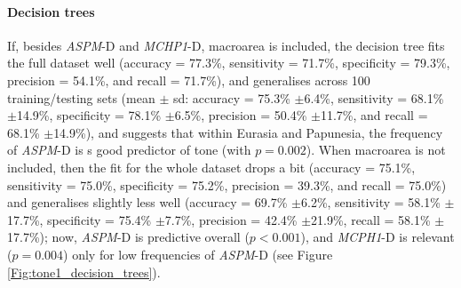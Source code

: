 \documentclass[twoside,twocolumn]{article}
\begin{document}
\paragraph{Decision trees}

If, besides \textit{ASPM}-D and \textit{MCHP1}-D, macroarea is included, the decision tree fits the full dataset well (accuracy = 77.3\%, sensitivity = 71.7\%, specificity = 79.3\%, precision = 54.1\%, and recall = 71.7\%), and generalises across 100 training/testing sets (mean $\pm$ sd: accuracy = 75.3\% $\pm$6.4\%, sensitivity = 68.1\% $\pm$14.9\%, specificity = 78.1\% $\pm$6.5\%, precision = 50.4\% $\pm$11.7\%, and recall = 68.1\% $\pm$14.9\%), and suggests that within Eurasia and Papunesia, the frequency of \textit{ASPM}-D is s good predictor of tone (with $p = 0.002$).
When macroarea is not included, then the fit for the whole dataset drops a bit (accuracy = 75.1\%, sensitivity = 75.0\%, specificity = 75.2\%, precision = 39.3\%, and recall = 75.0\%) and generalises slightly less well (accuracy = 69.7\% $\pm$6.2\%, sensitivity = 58.1\% $\pm$17.7\%, specificity = 75.4\% $\pm$7.7\%, precision = 42.4\% $\pm$21.9\%, recall = 58.1\% $\pm$17.7\%); now, \textit{ASPM}-D is predictive overall ($p < 0.001$), and \textit{MCPH1}-D is relevant ($p = 0.004$) only for low frequencies of \textit{ASPM}-D (see Figure \ref{Fig:tone1_decision_trees}).
\end{document}
